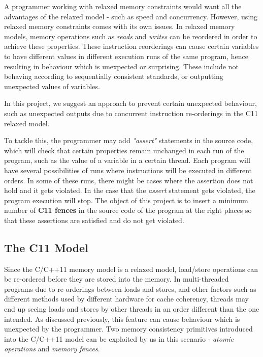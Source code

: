 \par
A programmer working with relaxed memory constraints would want all the advantages of the relaxed model - such as speed and concurrency. However, using relaxed memory constraints comes with its own issues. In relaxed memory models, memory operations such as \textit{reads} and \textit{writes} can be reordered in order to achieve these properties. These instruction reorderings can cause certain variables to have different values in different execution runs of the same program, hence resulting in behaviour which is unexpected or surprising. These include not behaving according to sequentially consistent standards, or outputting unexpected values of variables.

\par
In this project, we suggest an approach to prevent certain unexpected behaviour, such as unexpected outputs due to concurrent instruction re-orderings in the C11 relaxed model.

\par
To tackle this, the programmer may add \textit{"assert"} statements in the source code, which will check that certain properties remain unchanged in each run of the program, such as the value of a variable in a certain thread. Each program will have several possibilities of runs where instructions will be executed in different orders. In some of these runs, there might be cases where the assertion does not hold and it gets violated. In the case that the \textit{assert} statement gets violated, the program execution will stop. The object of this project is to insert a minimum number of \textbf{C11 fences} in the source code of the program at the right places so that these assertions are satisfied and do not get violated.

\subsection{The C11 Model}
\par
Since the C/C++11 memory model is a relaxed model, load/store operations can be re-ordered before they are stored into the memory. In multi-threaded programs due to re-orderings between loads and stores, and other factors such as different methods used by different hardware for cache coherency, threads may end up seeing loads and stores by other threads in an order different than the one intended. As discussed previously, this feature can cause behaviour which is unexpected by the programmer. Two memory consistency primitives introduced into the C/C++11 model can be exploited by us in this scenario - \textit{atomic operations} and \textit{memory fences}. 

